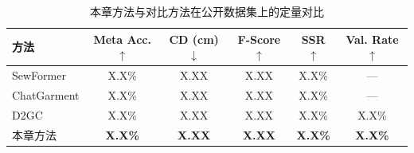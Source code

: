 \begin{table}[t]
    \centering
    \caption{本章方法与对比方法在公开数据集上的定量对比}
    \label{tab:ch4-comparison}
    \setlength{\tabcolsep}{7pt}
    \begin{tabular}{lccccc}
        \toprule
        \textbf{方法}
        & \textbf{Meta Acc.}$\uparrow$ & \textbf{CD (cm)}$\downarrow$ & \textbf{F-Score}$\uparrow$ & \textbf{SSR}$\uparrow$ & \textbf{Val. Rate}$\uparrow$ \\
        \midrule
        SewFormer\cite{liu2023sewformer}
        & X.X\% & X.XX & X.XX & X.X\% & — \\
        ChatGarment\cite{bian2024chatgarment}
        & X.X\% & X.XX & X.XX & X.X\% & — \\
        D2GC\cite{zhou2025design2garmentcode}
        & X.X\% & X.XX & X.XX & X.X\% & X.X\% \\
        本章方法
        & \textbf{X.X\%} & \textbf{X.XX} & \textbf{X.XX} & \textbf{X.X\%} & \textbf{X.X\%} \\
        \bottomrule
    \end{tabular}
\end{table}
